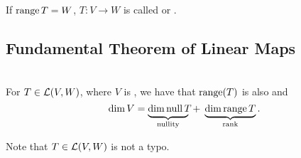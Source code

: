 \setcounter{thm}{18}
\begin{mydef} [surjectivity]
  \label{def: surjectivity}
  If $\operatorname{range} T=W$, $T:V\to W$ is called  or .
\end{mydef}

\subsection{Fundamental Theorem of Linear Maps}

\begin{thm} 
  \label{rank-nullity-theorem}
  \phantom{.} \\
  For $T \in \mathcal{L}(V,W)$, where $V$ is \fd, we have that $\operatorname{range}(T)$ is also \fd and
  \begin{equation}
    \dim V =
    \underbrace{ \dim\operatorname{null} T\phantom{g}\!\!\!\!\!}_{\text{nullity}}
    \; + \; \underbrace{\dim \operatorname{range} T}_{\text{rank}}.
  \end{equation}

  Note that $T \in \mathcal{L}(V,W)$ is not a typo.
\end{thm}
